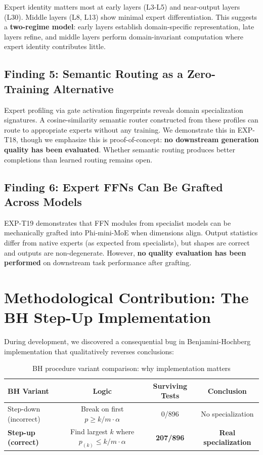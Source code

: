 \documentclass[11pt,a4paper]{article}
\begin{document}
Expert identity matters most at early layers (L3-L5) and near-output layers (L30). Middle layers (L8, L13) show minimal expert differentiation. This suggests a \textbf{two-regime model}: early layers establish domain-specific representation, late layers refine, and middle layers perform domain-invariant computation where expert identity contributes little.

\subsection{Finding 5: Semantic Routing as a Zero-Training Alternative}

Expert profiling via gate activation fingerprints reveals domain specialization signatures. A cosine-similarity semantic router constructed from these profiles can route to appropriate experts without any training. We demonstrate this in EXP-T18, though we emphasize this is proof-of-concept: \textbf{no downstream generation quality has been evaluated}. Whether semantic routing produces better completions than learned routing remains open.

\subsection{Finding 6: Expert FFNs Can Be Grafted Across Models}

EXP-T19 demonstrates that FFN modules from specialist models can be mechanically grafted into Phi-mini-MoE when dimensions align. Output statistics differ from native experts (as expected from specialists), but shapes are correct and outputs are non-degenerate. However, \textbf{no quality evaluation has been performed} on downstream task performance after grafting.

\section{Methodological Contribution: The BH Step-Up Implementation}

During development, we discovered a consequential bug in Benjamini-Hochberg implementation that qualitatively reverses conclusions:

\begin{table}[h]
\centering
\caption{BH procedure variant comparison: why implementation matters}
\label{tab:bh_comparison}
\begin{tabular}{lccc}
\toprule
\textbf{BH Variant} & \textbf{Logic} & \textbf{Surviving Tests} & \textbf{Conclusion} \\
\midrule
Step-down (incorrect) & Break on first $p \geq k/m \cdot \alpha$ & 0/896 & No specialization \\
\textbf{Step-up (correct)} & Find largest $k$ where $p_{(k)} \leq k/m \cdot \alpha$ & \textbf{207/896} & \textbf{Real specialization} \\
\bottomrule
\end{tabular}
\end{table}
\end{document}
